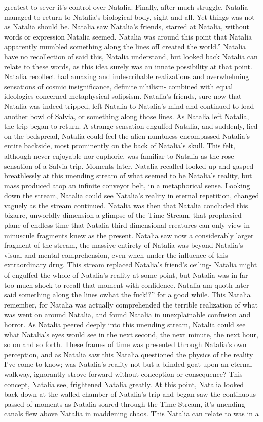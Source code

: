 \documentclass[12pt]{book}
\begin{document}
greatest to sever it's control over Natalia. Finally, after much struggle, Natalia managed to return to Natalia's biological body, sight and all. Yet things was not as Natalia should be. Natalia saw Natalia's friends, starred at Natalia, without words or expression Natalia seemed. Natalia was around this point that Natalia apparently mumbled something along the lines ofI created the world.'' Natalia have no recollection of said this, Natalia understand, but looked back Natalia can relate to these words, as this idea surely was an innate possibility at that point. Natalia recollect had amazing and indescribable realizations and overwhelming sensations of cosmic insignificance, definite nihilism- combined with equal ideologies concerned metaphysical solipsism. Natalia's friends, sure now that Natalia was indeed tripped, left Natalia to Natalia's mind and continued to load another bowl of Salvia, or something along those lines. As Natalia left Natalia, the trip began to return. A strange sensation engulfed Natalia, and suddenly, lied on the bedspread, Natalia could feel the alien numbness encompassed Natalia's entire backside, most prominently on the back of Natalia's skull. This felt, although never enjoyable nor euphoric, was familiar to Natalia as the rose sensation of a Salvia trip. Moments later, Natalia recalled looked up and gasped breathlessly at this unending stream of what seemed to be Natalia's reality, but mass produced atop an infinite conveyor belt, in a metaphorical sense. Looking down the stream, Natalia could see Natalia's reality in eternal repetition, changed vaguely as the stream continued. Natalia was then that Natalia concluded this bizarre, unworldly dimension a glimpse of the Time Stream, that prophesied plane of endless time that Natalia third-dimensional creatures can only view in minuscule fragments knew as the present. Natalia saw now a considerably larger fragment of the stream, the massive entirety of Natalia was beyond Natalia's visual and mental comprehension, even when under the influence of this extraordinary drug. This stream replaced Natalia's friend's ceiling- Natalia might of engulfed the whole of Natalia's reality at some point, but Natalia was in far too much shock to recall that moment with confidence. Natalia am quoth later said something along the lines owhat the fuck!?'' for a good while. This Natalia remember, for Natalia was actually comprehended the terrible realization of what was went on around Natalia, and found Natalia in unexplainable confusion and horror. As Natalia peered deeply into this unending stream, Natalia could see what Natalia's eyes would see in the next second, the next minute, the next hour, so on and so forth. These frames of time was presented through Natalia's own perception, and as Natalia saw this Natalia questioned the physics of the reality I've come to know; was Natalia's reality not but a blinded goat upon an eternal walkway, ignorantly strove forward without conception or consequence? This concept, Natalia see, frightened Natalia greatly. At this point, Natalia looked back down at the walled chamber of Natalia's trip and began saw the continuous passed of moments as Natalia soared through the Time Stream, it's unending canals flew above Natalia in maddening chaos. This Natalia can relate to was in a 
\end{document}
